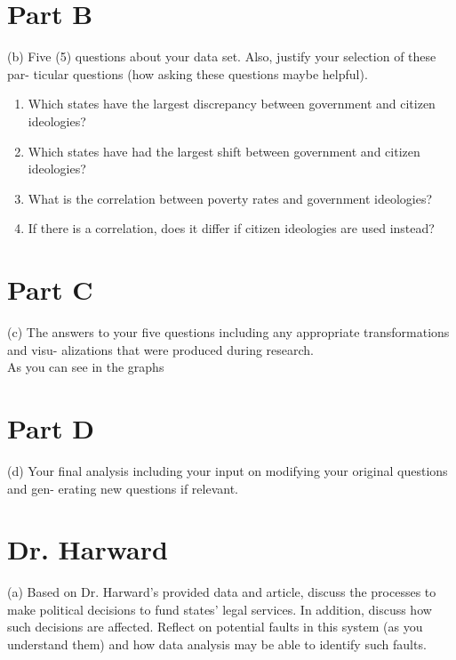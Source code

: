 \documentclass[11pt]{article}
\begin{document}
\section{Part B}
(b) Five (5) questions about your data set. Also, justify your selection of these par-
ticular questions (how asking these questions maybe helpful).\\




\begin{enumerate}
\item Which states have the largest discrepancy between government and citizen ideologies?\\
\item Which states have had the largest shift between government and citizen ideologies?
\item What is the correlation between poverty rates and government ideologies?
\item If there is a correlation, does it differ if citizen ideologies are used instead?
\end{enumerate}

\section{Part C}
(c) The answers to your five questions including any appropriate transformations and visu-
alizations that were produced during research.\\

As you can see in the graphs





\section{Part D}
(d) Your final analysis including your input on modifying your original questions and gen-
erating new questions if relevant.\\

\section{ Dr. Harward} 

(a) Based on Dr. Harward’s provided data and article, discuss the processes to make political
decisions to fund states’ legal services. In addition, discuss how such decisions are
affected. Reflect on potential faults in this system (as you understand them) and how data analysis may be able to identify such faults.





\end{document}
